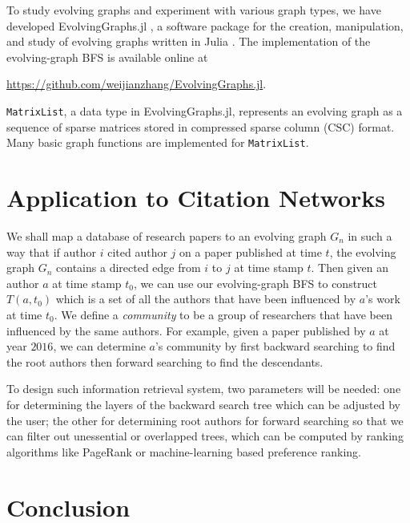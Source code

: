 \documentclass[11pt,conference,compsocconf]{IEEEtran}
\theoremstyle{definition}
\begin{document}
To study evolving graphs and experiment with various graph types, we have developed EvolvingGraphs.jl  \cite{zhang15}, a software package for the creation, manipulation, and study of evolving graphs written in Julia \cite{bkse12}. The implementation of the evolving-graph BFS is
available online at
\begin{center}
\url{https://github.com/weijianzhang/EvolvingGraphs.jl}.
\end{center}
 \texttt{MatrixList}, a data type in EvolvingGraphs.jl,  represents an evolving graph
as a sequence of sparse matrices stored in compressed sparse column (CSC) format.
Many basic graph functions are implemented for \texttt{MatrixList}.


\section{Application to Citation Networks}
\label{sec:applications}

We shall map a database of research papers to an evolving graph $G_n$
in such a way that if author $i$ cited author $j$ on a paper published
at  time $t$, the evolving graph $G_n$ contains a directed edge from
$i$ to $j$ at time stamp $t$. Then given an author $a$ at time stamp $t_0$,
we can use our evolving-graph BFS to construct $T(a, t_0)$ which is
a set of all the authors that have been influenced by $a$'s work at
time $t_0$. We define a \emph{community} to be a group of
researchers that have been influenced by the same authors.
For example, given a paper published by $a$ at year $2016$,
we can determine $a$'s community by first backward searching to
find the root authors then forward searching to find the descendants.

To design such information retrieval system, two parameters will be needed:
 one for determining the layers of the backward search tree which can be
adjusted by the user;
the other for determining root authors for forward searching
so that we can
filter out unessential or overlapped trees, which can be computed
by ranking algorithms like PageRank \cite{pbmw99} or machine-learning based preference ranking.


\section{Conclusion}
\end{document}
